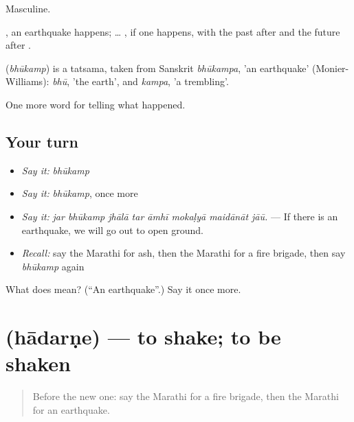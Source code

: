 Masculine.

 , an earthquake happens;  …  , if one happens, with the past after  and the future after .

\begin{cousinweb}
\textbf{} (\emph{bhūkamp}) is a tatsama, taken from Sanskrit \emph{bhūkampa}, 'an earthquake' (Monier-Williams): \emph{bhū}, 'the earth', and \emph{kampa}, 'a trembling'.
\end{cousinweb}

\begin{grammarlens}[title={What you've built}]
One more word for telling what happened.
\end{grammarlens}

\subsection*{Your turn}
\begin{itemize}
\raggedright
  \item \emph{Say it:} \emph{bhūkamp}
  \item \emph{Say it:} \emph{bhūkamp}, once more
  \item \emph{Say it:} \emph{jar bhūkamp jhālā tar āmhī mokaḷyā maidānāt jāū.} — If there is an earthquake, we will go out to open ground.
  \item \emph{Recall:} say the Marathi for ash, then the Marathi for a fire brigade, then say \emph{bhūkamp} again
\end{itemize}

\begin{tcolorbox}[breakable,colback=teal!4,colframe=teal!35!black,title={Before you move on}]
What does  mean? (\textquotedblleft{}An earthquake\textquotedblright{}.) Say it once more.
\end{tcolorbox}
\section[\texorpdfstring{\mr{हादरणे} (hādarṇe)}{हादरणे (hādarṇe)}]{ (hādarṇe) — to shake; to be shaken}

\label{lesson:MR-C293-hadarne}



\begin{quote}
Before the new one: say the Marathi for a fire brigade, then the Marathi for an earthquake.
\end{quote}

